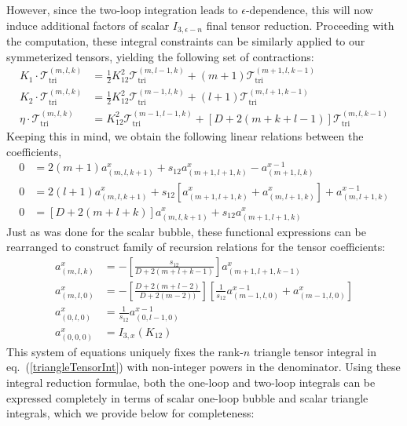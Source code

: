 \documentclass[12pt,letter]{article}
\def\eqn#1{eq.~(\ref{#1})}
\begin{document}
 However, since the two-loop integration leads to $\epsilon$-dependence, this will now induce additional factors of scalar $I_{3,\epsilon - n}$ final tensor reduction. Proceeding with the computation, these integral constraints can be similarly applied to our symmeterized tensors, yielding the following set of contractions:
\begin{align}
K_1\cdot \mathcal{T}^{(m,l,k)}_{\text{tri}} &=\frac{1}{2}K_{12}^2\mathcal{T}^{(m,l-1,k)}_{\text{tri}} + (m+1)\mathcal{T}^{(m+1,l,k-1)}_{\text{tri}} 
\\
K_2\cdot \mathcal{T}^{(m,l,k)}_{\text{tri}} &=\frac{1}{2}K_{12}^2\mathcal{T}^{(m-1,l,k)}_{\text{tri}} +(l+1)\mathcal{T}^{(m,l+1,k-1)}_{\text{tri}} 
\\
\eta\cdot  \mathcal{T}^{(m,l,k)}_{\text{tri}} &= K_{12}^2\mathcal{T}^{(m-1,l-1,k)}_{\text{tri}} +\left[D+2(m+k+l-1)\right]\mathcal{T}^{(m,l,k-1)}_{\text{tri}} 
\end{align}
Keeping this in mind, we obtain the following linear relations between the coefficients,
\begin{equation}
\begin{aligned}
0&=2(m+1)a_{(m,l,k+1)}^{x}+s_{12}a_{(m+1,l+1,k)}^{x}-a_{(m+1,l,k)}^{x-1}
\\
0&=2(l+1)a_{(m,l,k+1)}^{x}+s_{12}[a_{(m+1,l+1,k)}^{x}+a_{(m,l+1,k)}^{x}]+a_{(m,l+1,k)}^{x-1}
\\
0&=[D+2(m+l+k)]a_{(m,l,k+1)}^{x}+s_{12}a_{(m+1,l+1,k)}^{x}
\end{aligned}
\end{equation}
Just as was done for the scalar bubble, these functional expressions can be rearranged to construct family of recursion relations for the tensor coefficients:
\begin{equation}\label{eq:triRed}
\boxed{
\begin{aligned}
a_{(m,l,k)}^x&=-\left[\frac{s_{12}}{D+2(m+l+k-1)}\right]a_{(m+1,l+1,k-1)}^x
\\
a_{(m,l,0)}^x&=-\left[\frac{D+2(m+l-2)}{D+2(m-2))}\right]\left[\frac{1}{s_{12}} a^{x-1}_{(m-1,l,0)}+a^{x}_{(m-1,l,0)}\right]
\\
a^x_{(0,l,0)}&= \frac{1}{s_{12}} a_{(0,l-1,0)}^{x-1} 
\\
a^x_{(0,0,0)} &= I_{3,x}(K_{12})
\end{aligned}
}
\end{equation}
This system of equations uniquely fixes the rank-$n$ triangle tensor integral in \eqn{triangleTensorInt} with non-integer powers in the denominator. Using these integral reduction formulae, both the one-loop and two-loop integrals can be expressed completely in terms of scalar one-loop bubble and scalar triangle integrals, which we provide below for completeness:
\end{document}

